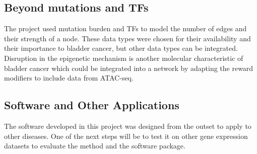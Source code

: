 \subsection*{Beyond mutations and TFs}

The project used mutation burden and TFs to model the number of edges and their strength of a node. These data types were chosen for their availability and their importance to bladder cancer, but other data types can be integrated. Disruption in the epigenetic mechanism is another molecular characteristic of bladder cancer which could be integrated into a network by adapting the reward modifiers to include data from ATAC-seq.

\subsection*{Software and Other Applications}

The software developed in this project was designed from the outset to apply to other diseases. One of the next steps will be to test it on other gene expression datasets to evaluate the method and the software package.


 
